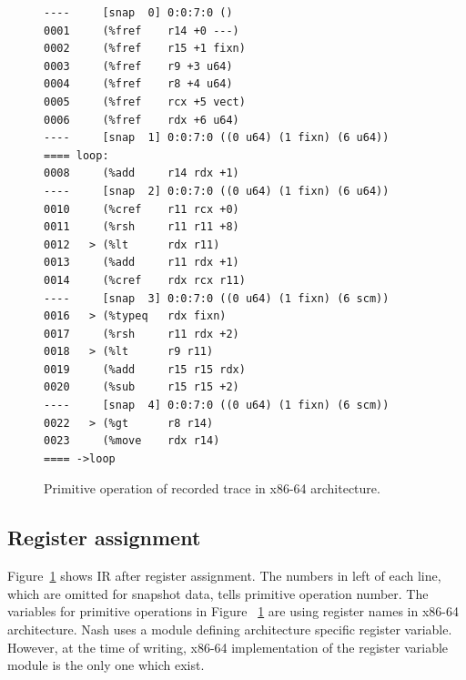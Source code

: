\documentclass[preprint, numbers]{sigplanconf}
\begin{document}
\begin{figure}
\begin{verbatim}
----     [snap  0] 0:0:7:0 ()
0001     (%fref    r14 +0 ---)
0002     (%fref    r15 +1 fixn)
0003     (%fref    r9 +3 u64)
0004     (%fref    r8 +4 u64)
0005     (%fref    rcx +5 vect)
0006     (%fref    rdx +6 u64)
----     [snap  1] 0:0:7:0 ((0 u64) (1 fixn) (6 u64))
==== loop:
0008     (%add     r14 rdx +1)
----     [snap  2] 0:0:7:0 ((0 u64) (1 fixn) (6 u64))
0010     (%cref    r11 rcx +0)
0011     (%rsh     r11 r11 +8)
0012   > (%lt      rdx r11)
0013     (%add     r11 rdx +1)
0014     (%cref    rdx rcx r11)
----     [snap  3] 0:0:7:0 ((0 u64) (1 fixn) (6 scm))
0016   > (%typeq   rdx fixn)
0017     (%rsh     r11 rdx +2)
0018   > (%lt      r9 r11)
0019     (%add     r15 r15 rdx)
0020     (%sub     r15 r15 +2)
----     [snap  4] 0:0:7:0 ((0 u64) (1 fixn) (6 scm))
0022   > (%gt      r8 r14)
0023     (%move    rdx r14)
==== ->loop
\end{verbatim}
\caption{Primitive operation of recorded trace in x86-64 architecture.}
\label{fig:primops}
\end{figure}

\subsection{Register assignment}
Figure~\hyperref[fig:primops]{\ref{fig:primops}} shows IR after register
assignment. The numbers in left of each line, which are omitted for snapshot
data, tells primitive operation number. The variables for primitive operations
in Figure~ \hyperref[fig:primops]{\ref{fig:primops}} are using register names
in x86-64 architecture. Nash uses a module defining architecture specific
register variable. However, at the time of writing, x86-64 implementation of
the register variable module is the only one which exist.
\end{document}
